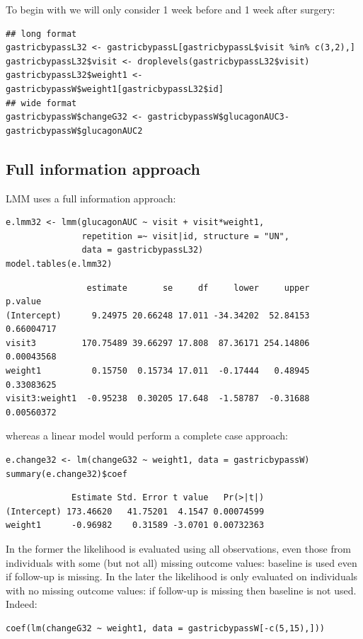\documentclass[12pt]{article}
\begin{document}
To begin with we will only consider 1 week before and 1 week after
surgery:
\lstset{language=r,label= ,caption= ,captionpos=b,numbers=none}
\begin{lstlisting}
## long format
gastricbypassL32 <- gastricbypassL[gastricbypassL$visit %in% c(3,2),]
gastricbypassL32$visit <- droplevels(gastricbypassL32$visit)
gastricbypassL32$weight1 <- gastricbypassW$weight1[gastricbypassL32$id]
## wide format
gastricbypassW$changeG32 <- gastricbypassW$glucagonAUC3-gastricbypassW$glucagonAUC2
\end{lstlisting}

\clearpage

\subsection{Full information approach}
\label{sec:org58149a0}

LMM uses a full information approach:
\lstset{language=r,label= ,caption= ,captionpos=b,numbers=none}
\begin{lstlisting}
e.lmm32 <- lmm(glucagonAUC ~ visit + visit*weight1,
               repetition =~ visit|id, structure = "UN",
               data = gastricbypassL32)
model.tables(e.lmm32)
\end{lstlisting}

\begin{verbatim}
                estimate       se     df     lower     upper    p.value
(Intercept)      9.24975 20.66248 17.011 -34.34202  52.84153 0.66004717
visit3         170.75489 39.66297 17.808  87.36171 254.14806 0.00043568
weight1          0.15750  0.15734 17.011  -0.17444   0.48945 0.33083625
visit3:weight1  -0.95238  0.30205 17.648  -1.58787  -0.31688 0.00560372
\end{verbatim}


whereas a linear model would perform a complete case approach:
\lstset{language=r,label= ,caption= ,captionpos=b,numbers=none}
\begin{lstlisting}
e.change32 <- lm(changeG32 ~ weight1, data = gastricbypassW)
summary(e.change32)$coef
\end{lstlisting}

\begin{verbatim}
             Estimate Std. Error t value   Pr(>|t|)
(Intercept) 173.46620   41.75201  4.1547 0.00074599
weight1      -0.96982    0.31589 -3.0701 0.00732363
\end{verbatim}


In the former the likelihood is evaluated using all observations, even
those from individuals with some (but not all) missing outcome values:
baseline is used even if follow-up is missing. In the later the
likelihood is only evaluated on individuals with no missing outcome
values: if follow-up is missing then baseline is not used. Indeed:
\lstset{language=r,label= ,caption= ,captionpos=b,numbers=none}
\begin{lstlisting}
coef(lm(changeG32 ~ weight1, data = gastricbypassW[-c(5,15),]))
\end{lstlisting}
\end{document}
